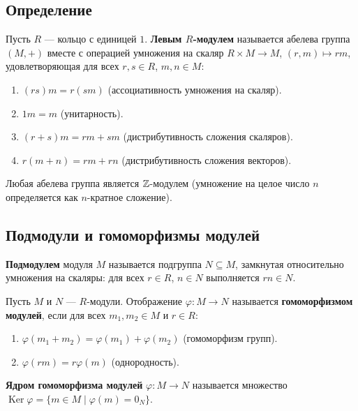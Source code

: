 \documentclass[10pt]{article}
\begin{document}
\subsection{Определение}
\begin{definition}
Пусть $R$ — кольцо с единицей $1$. \textbf{Левым $R$-модулем} называется абелева группа $(M, +)$ вместе с операцией умножения на скаляр $R \times M \to M$, $(r,m) \mapsto rm$, удовлетворяющая для всех $r,s \in R$, $m,n \in M$:
\begin{enumerate}
    \item $(rs)m = r(sm)$ (ассоциативность умножения на скаляр).
    \item $1m = m$ (унитарность).
    \item $(r+s)m = rm + sm$ (дистрибутивность сложения скаляров).
    \item $r(m+n) = rm + rn$ (дистрибутивность сложения векторов).
\end{enumerate}
\end{definition}

\begin{example}
    Любая абелева группа является $\mathbb{Z}$-модулем (умножение на целое число $n$ определяется как $n$-кратное сложение).
\end{example}

\subsection{Подмодули и гомоморфизмы модулей}
\begin{definition}
\textbf{Подмодулем} модуля $M$ называется подгруппа $N \subseteq M$, замкнутая относительно умножения на скаляры: для всех $r \in R$, $n \in N$ выполняется $rn \in N$.
\end{definition}

\begin{definition}
Пусть $M$ и $N$ — $R$-модули. Отображение $\varphi: M \to N$ называется \textbf{гомоморфизмом модулей}, если для всех $m_1, m_2 \in M$ и $r \in R$:
\begin{enumerate}
    \item $\varphi(m_1 + m_2) = \varphi(m_1) + \varphi(m_2)$ (гомоморфизм групп).
    \item $\varphi(rm) = r\varphi(m)$ (однородность).
\end{enumerate}
\end{definition}

\begin{definition}
\textbf{Ядром гомоморфизма модулей} $\varphi: M \to N$ называется множество $\operatorname{Ker}\varphi = \{m \in M \mid \varphi(m) = 0_N\}$.
\end{definition}
\end{document}
